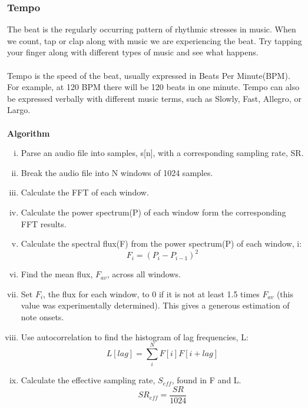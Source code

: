 \subsubsection{Tempo}
The beat is the regularly occurring pattern of rhythmic stresses in music. When we count, tap or clap along 
with music we are experiencing the beat. Try tapping your finger along with different types of music and see 
what happens.\\ 
\\
Tempo is the speed of the beat, usually expressed in Beats Per Minute(BPM). For example, at 120 BPM 
there will be 120 beats in one minute. Tempo can also be expressed verbally with different music terms, 
such as Slowly, Fast, Allegro, or Largo.\\
\\
\textbf{Algorithm}
\begin{enumerate}[(i)]
        \item Parse an audio file into samples, s[n], with a corresponding sampling rate, SR.
        \item Break the audio file into N windows of 1024 samples.
        \item Calculate the FFT of each window.
        \item Calculate the power spectrum(P) of each window form the corresponding FFT results.
        \item Calculate the spectral flux(F) from the power spectrum(P) of each window, i:
                \begin{equation}
                        F_i = (P_i - P_{i-1})^2
                \end{equation}
        \item Find the mean flux, $F_{av}$, across all windows.
        \item Set $F_i$, the flux for each window, to 0 if it is not at least 1.5 times $F_{av}$ (this value
                was experimentally determined). This gives a generous estimation of note onsets.
        \item Use autocorrelation to find the histogram of lag frequencies, L:
                \begin{equation}
                        L[lag] = \sum_{i}^{N}{F[i]F[i+lag]}
                \end{equation}
        \item Calculate the effective sampling rate, $S_{eff}$, found in F and L.
                \begin{equation}
                        SR_{eff} = \frac{SR}{1024}

\end{equation}
\end{enumerate}

